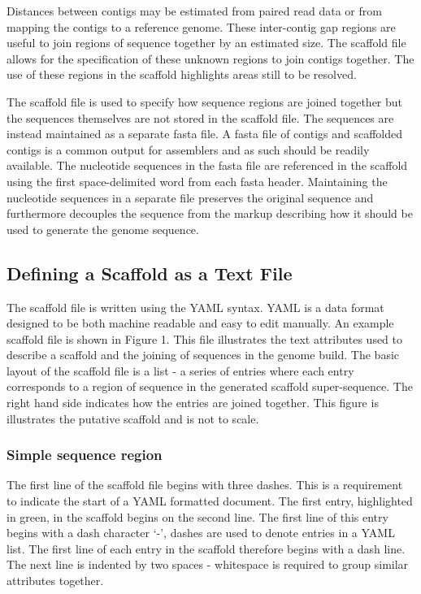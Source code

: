 \documentclass[10pt]{bmc_article}
\newenvironment{bmcformat}{\begin{raggedright}\baselineskip20pt\sloppy\setboolean{publ}{false}}{\end{raggedright}\baselineskip20pt\sloppy}
\begin{document}
\begin{bmcformat}
Distances between contigs may be estimated from paired read data or from
mapping the contigs to a reference genome. These inter-contig gap regions are
useful to join regions of sequence together by an estimated size. The scaffold
file allows for the specification of these unknown regions to join contigs
together. The use of these regions in the scaffold highlights areas still to be
resolved. \pb

The scaffold file is used to specify how sequence regions are joined together
but the sequences themselves are not stored in the scaffold file. The sequences
are instead maintained as a separate fasta file. A fasta file of contigs and
scaffolded contigs is a common output for assemblers and as such should be
readily available. The nucleotide sequences in the fasta file are referenced in
the scaffold using the first space-delimited word from each fasta header.
Maintaining the nucleotide sequences in a separate file preserves the original
sequence and furthermore decouples the sequence from the markup describing how
it should be used to generate the genome sequence. \pb

\subsection*{Defining a Scaffold as a Text File} %

The scaffold file is written using the YAML syntax. YAML is a data format
designed to be both machine readable and easy to edit manually. An example
scaffold file is shown in Figure 1. This file illustrates the text attributes
used to describe a scaffold and the joining of sequences in the genome build.
The basic layout of the scaffold file is a list - a series of entries where
each entry corresponds to a region of sequence in the generated scaffold
super-sequence. The right hand side indicates how the entries are joined
together. This figure is illustrates the putative scaffold and is not to scale.
\pb

\subsubsection*{Simple sequence region} %

The first line of the scaffold file begins with three dashes. This is
a requirement to indicate the start of a YAML formatted document. The first
entry, highlighted in green, in the scaffold begins on the second line. The
first line of this entry begins with a dash character `-', dashes are used to
denote entries in a YAML list. The first line of each entry in the scaffold
therefore begins with a dash line. The next line is indented by two spaces
- whitespace is required to group similar attributes together. \pb


\end{bmcformat}
\end{document}
